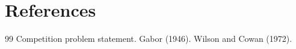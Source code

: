 \documentclass[12pt,a4paper]{article}
\renewcommand{\refname}{参考文献}
\begin{document}
\setcounter{page}{1}



\clearpage
\section{References}
\renewcommand{\refname}{}
\begin{thebibliography}{99}
 Competition problem statement.
 Gabor (1946).
 Wilson and Cowan (1972).
\end{thebibliography}
\end{document}
